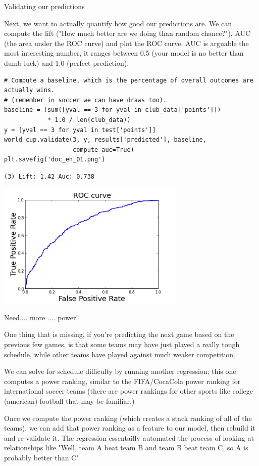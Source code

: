 \documentclass[12pt,fleqn]{article}\usepackage{../common}
\begin{document}
Validating our predictions

Next, we want to actually quantify how good our predictions are. We can
compute the lift ("How much better are we doing than random chance?"), AUC
(the area under the ROC curve) and plot the ROC curve. AUC is arguable the
most interesting number, it ranges between 0.5 (your model is no better
than dumb luck) and 1.0 (perfect prediction).

\begin{verbatim}
# Compute a baseline, which is the percentage of overall outcomes are actually wins.
# (remember in soccer we can have draws too).
baseline = (sum([yval == 3 for yval in club_data['points']]) 
            * 1.0 / len(club_data))
y = [yval == 3 for yval in test['points']]
world_cup.validate(3, y, results['predicted'], baseline, 
                   compute_auc=True)
plt.savefig('doc_en_01.png')
\end{verbatim}

\begin{verbatim}
(3) Lift: 1.42 Auc: 0.738
\end{verbatim}

\includegraphics[height=6cm]{doc_en_01.png}

Need.... more .... power!

One thing that is missing, if you're predicting the next game based on the
previous few games, is that some teams may have just played a really tough
schedule, while other teams have played against much weaker competition.

We can solve for schedule difficulty by running another regression; this
one computes a power ranking, similar to the FIFA/CocaCola power ranking
for international soccer teams (there are power rankings for other sports
like college (american) football that may be familiar.)

Once we compute the power ranking (which creates a stack ranking of all of
the teams), we can add that power ranking as a feature to our model, then
rebuild it and re-validate it. The regression essentailly automated the
process of looking at relationships like "Well, team A beat team B and team
B beat team C, so A is probably better than C".
\end{document}
